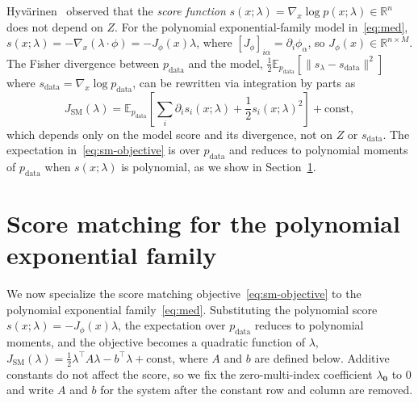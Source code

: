 \documentclass{article}
\newcommand{\R}{\mathbb{R}}
\newcommand{\E}{\mathbb{E}}
\theoremstyle{definition}
\begin{document}
Hyv\"arinen~\cite{hyvarinen2005} observed that the \emph{score function}
$s(x;\lambda) = \nabla_x \log p(x;\lambda)\in \R^n$ does not depend on $Z$.
For the polynomial exponential-family model in~\eqref{eq:med},
$s(x;\lambda) = -\nabla_x(\lambda \cdot \phi) = -J_\phi(x)\lambda$,
where $[J_\phi]_{i\alpha} = \partial_i \phi_\alpha$, so $J_\phi(x) \in \R^{n \times M}$.
The Fisher divergence between $p_{\mathrm{data}}$ and the model,
$\frac{1}{2}\E_{p_{\mathrm{data}}}[\|s_\lambda - s_{\mathrm{data}}\|^2]$
where $s_{\mathrm{data}} = \nabla_x \log p_{\mathrm{data}}$,
can be rewritten via integration by parts as
\begin{equation}\label{eq:sm-objective}
    J_{\mathrm{SM}}(\lambda) = \E_{p_{\mathrm{data}}}\!\left[
    \sum_i \partial_i s_i(x;\lambda) + \frac{1}{2} s_i(x;\lambda)^2
    \right] + \text{const},
\end{equation}
which depends only on the model score and its divergence,
not on $Z$ or $s_{\mathrm{data}}$.
The expectation in~\eqref{eq:sm-objective} is over $p_{\mathrm{data}}$
and reduces to polynomial moments of $p_{\mathrm{data}}$ when
$s(x;\lambda)$ is polynomial, as we show in Section~\ref{sec:sm}.

\section{Score matching for the polynomial exponential family}
\label{sec:sm}

We now specialize the score matching objective~\eqref{eq:sm-objective}
to the polynomial exponential family~\eqref{eq:med}.
Substituting the polynomial score $s(x;\lambda) = -J_\phi(x)\lambda$,
the expectation over $p_{\mathrm{data}}$ reduces to polynomial moments,
and the objective becomes a quadratic function of $\lambda$,
$J_{\mathrm{SM}}(\lambda) = \frac{1}{2}\lambda^\top A\lambda - b^\top\lambda + \text{const}$,
where $A$ and $b$ are defined below.
Additive constants do not affect the score, so we fix
the zero-multi-index coefficient $\lambda_{\mathbf{0}}$ to $0$
and write $A$ and $b$ for the system after the
constant row and column are removed.
\end{document}
